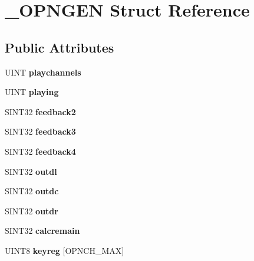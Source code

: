 \hypertarget{struct__OPNGEN}{\section{\-\_\-\-O\-P\-N\-G\-E\-N Struct Reference}
\label{struct__OPNGEN}
}
\subsection*{Public Attributes}
\begin{DoxyCompactItemize}
\item 
\hypertarget{struct__OPNGEN_a7a4c6eb6791a37b2722aeec8b57f0dad}{U\-I\-N\-T {\bfseries playchannels}}\label{struct__OPNGEN_a7a4c6eb6791a37b2722aeec8b57f0dad}

\item 
\hypertarget{struct__OPNGEN_abf3b5a75403fdabce2e338b9ec29ea80}{U\-I\-N\-T {\bfseries playing}}\label{struct__OPNGEN_abf3b5a75403fdabce2e338b9ec29ea80}

\item 
\hypertarget{struct__OPNGEN_a61168de058d2106894234de2c057c6d6}{S\-I\-N\-T32 {\bfseries feedback2}}\label{struct__OPNGEN_a61168de058d2106894234de2c057c6d6}

\item 
\hypertarget{struct__OPNGEN_aa401c1dbbe54ea2873e22049c214c6d4}{S\-I\-N\-T32 {\bfseries feedback3}}\label{struct__OPNGEN_aa401c1dbbe54ea2873e22049c214c6d4}

\item 
\hypertarget{struct__OPNGEN_a6b7abec957d35c0537ce6f9a15b9fff1}{S\-I\-N\-T32 {\bfseries feedback4}}\label{struct__OPNGEN_a6b7abec957d35c0537ce6f9a15b9fff1}

\item 
\hypertarget{struct__OPNGEN_a718a38eff2b02de98c64c297746f3b5f}{S\-I\-N\-T32 {\bfseries outdl}}\label{struct__OPNGEN_a718a38eff2b02de98c64c297746f3b5f}

\item 
\hypertarget{struct__OPNGEN_a6fa5dc7bae0ee8d43245560e711d8e74}{S\-I\-N\-T32 {\bfseries outdc}}\label{struct__OPNGEN_a6fa5dc7bae0ee8d43245560e711d8e74}

\item 
\hypertarget{struct__OPNGEN_afb24e9ad8b2aea71739bc261ac2e8bc2}{S\-I\-N\-T32 {\bfseries outdr}}\label{struct__OPNGEN_afb24e9ad8b2aea71739bc261ac2e8bc2}

\item 
\hypertarget{struct__OPNGEN_ac8a99804ed01608d4256a4db8eb0db81}{S\-I\-N\-T32 {\bfseries calcremain}}\label{struct__OPNGEN_ac8a99804ed01608d4256a4db8eb0db81}

\item 
\hypertarget{struct__OPNGEN_afe966ddd855baecef40143a3ad1a6130}{U\-I\-N\-T8 {\bfseries keyreg} \mbox{[}O\-P\-N\-C\-H\-\_\-\-M\-A\-X\mbox{]}}\label{struct__OPNGEN_afe966ddd855baecef40143a3ad1a6130}

\end{DoxyCompactItemize}


